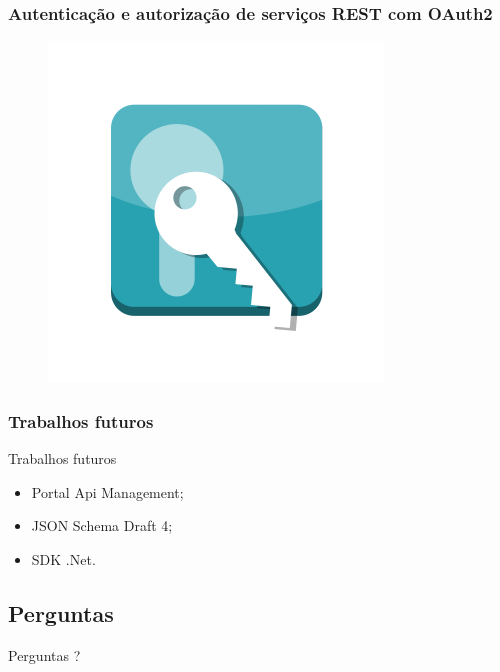 \documentclass{beamer}
\begin{document}
\begin{frame}
  \frametitle{Autenticação e autorização de serviços REST com OAuth2}

	\begin{figure}
	\centering
		\includegraphics[scale=0.4]{img/oauth2.png}
	\end{figure}
  
\end{frame}



\begin{frame}
  \frametitle{Trabalhos futuros}

  \begin{exampleblock}{Trabalhos futuros}
  
	  \begin{itemize}
 	    \item<1->Portal Api Management;
    	    \item<1->JSON Schema Draft 4;
    	    \item<1->SDK .Net.
	  \end{itemize}

  \end{exampleblock}

  
\end{frame}




\subsection{Perguntas}


\begin{frame}[c]{ }
\centering
  \huge{Perguntas ?}
\end{frame}
\end{document}
